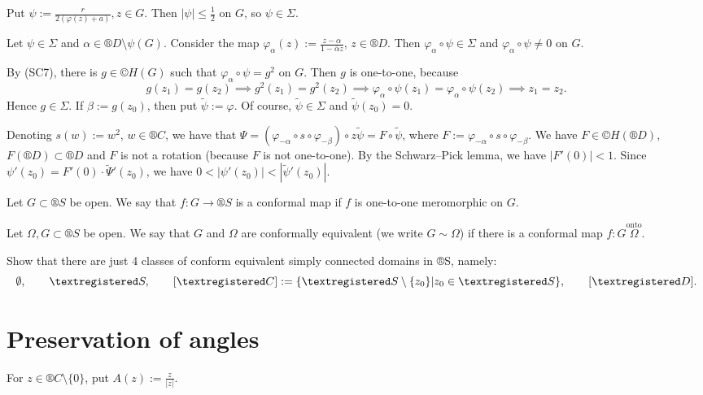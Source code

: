 \documentclass[12pt]{article}					%
\begin{document}
\begin{veta}[Riemann]
\begin{dukazin}
		Put $ψ := \frac{r}{2(φ(z) + a)}, z \in G$. Then $|ψ| ≤ \frac{1}{2}$ on $G$, so $ψ \in Σ$.
	\end{dukazin}

	\begin{dukazin}
		Let $ψ \in Σ$ and $α \in ®D \setminus ψ(G)$. Consider the map $φ_α(z) := \frac{z - α}{1 - \overline{α}z}$, $z \in ®D$. Then $φ_α ∘ ψ \in Σ$ and $φ_α ∘ ψ ≠ 0$ on $G$.

		By (SC7), there is $g \in ©H(G)$ such that $φ_α ∘ ψ = g^2$ on $G$. Then $g$ is one-to-one, because
		$$ g(z_1) = g(z_2) \implies g^2(z_1) = g^2(z_2) \implies φ_α ∘ ψ(z_1) = φ_α ∘ ψ(z_2) \implies z_1 = z_2. $$
		Hence $g \in Σ$. If $β := g(z_0)$, then put $\tilde ψ := φ$. Of course, $\tilde ψ \in Σ$ and $\tilde ψ(z_0) = 0$.

		Denoting $s(w) := w^2$, $w \in ®C$, we have that $Ψ = (φ_{-α} ∘ s ∘ φ_{-β}) ∘ z\tilde ψ = F ∘ \tilde ψ$, where $F := φ_{-α} ∘ s ∘ φ_{-β}$. We have $F \in ©H(®D)$, $F(®D) \subset ®D$ and $F$ is not a rotation (because $F$ is not one-to-one). By the Schwarz–Pick lemma, we have $|F'(0)| < 1$. Since $ψ'(z_0) = F'(0)·\tilde Ψ'(z_0)$, we have $0 < |ψ'(z_0)| < |\tilde ψ'(z_0)|$.
	\end{dukazin}
\end{veta}

\begin{definice}
	Let $G \subset ®S$ be open. We say that $f: G \rightarrow ®S$ is a conformal map if $f$ is one-to-one meromorphic on $G$.
\end{definice}

\begin{definice}
	Let $Ω, G \subset ®S$ be open. We say that $G$ and $Ω$ are conformally equivalent (we write $G \sim Ω$) if there is a conformal map $f: G \overset{\text{onto}} Ω$.
\end{definice}

\begin{priklad}
	Show that there are just 4 classes of conform equivalent simply connected domains in ®S, namely:
	$$ \O, \qquad ®S, \qquad [®C] := \{®S \setminus \{z_0\} | z_0 \in ®S\}, \qquad [®D]. $$
\end{priklad}


\section{Preservation of angles}

\begin{definice}
	For $z \in ®C \setminus \{0\}$, put $A(z) := \frac{z}{|z|}$.
\end{definice}
\end{document}
